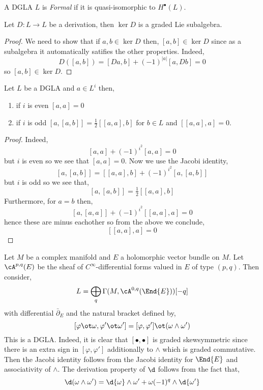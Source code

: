 \documentclass[12pt]{article}
\begin{document}
\begin{defn}
A DGLA $L$ is \textit{Formal} if it is quasi-isomorphic to $H^\bullet(L)$.
\end{defn}

\begin{prop}
Let $D : L \to L$ be a derivation, then $\ker{D}$ is a graded Lie subalgebra.
\end{prop}

\begin{proof}
We need to show that if $a, b \in \ker{D}$ then, $[a,b] \in \ker{D}$ since as a subalgebra it automatically satifies the other properties. Indeed, 
\[ D([a,b]) = [Da, b] + (-1)^{|a|} [a, Db] = 0 \]
so $[a,b] \in \ker{D}$.
\end{proof}

\begin{prop}
Let $L$ be a DGLA and $a \in L^i$ then,
\begin{enumerate}
\item if $i$ is even $[a,a] = 0$
\item if $i$ is odd $[a, [a,b]] = \tfrac{1}{2} [[a,a],b]$ for $b \in L$ and $[[a,a],a] = 0$.
\end{enumerate}
\end{prop}
\begin{proof}
Indeed,
\[ [a,a] + (-1)^{i^2} [a,a] = 0 \]
but $i$ is even so we see that $[a,a] = 0$. Now we use the Jacobi identity,
\[ [a,[a,b]] = [[a,a], b] + (-1)^{i^2} [a,[a,b]] \]
but $i$ is odd so we see that,
\[ [a,[a,b]] = \tfrac{1}{2} [[a,a],b] \]
Furthermore, for $a = b$ then,
\[ [a,[a,a]] + (-1)^{i^2} [[a,a],a] = 0 \]
hence these are minus eachother so from the above we conclude,
\[ [[a,a],a] = 0 \]
\end{proof}

\begin{example}
Let $M$ be a complex manifold and $E$ a holomorphic vector bundle on $M$. Let $\cA^{p,q}(E)$ be the sheaf of $C^{\infty}$-differential forms valued in $E$ of type $(p,q)$. Then consider,
\[ L = \bigoplus_q \Gamma(M, \cA^{0,q}(\End{E})) [-q] \]
with differential $\bar{\partial}_E$ and the natural bracket defined by,
\[ [\varphi \ot \omega, \varphi' \ot \omega'] = [\varphi, \varphi'] \ot (\omega \wedge \omega') \]
This is a DGLA. Indeed, it is clear that $[\bullet, \bullet]$ is graded skewsymmetric since there is an extra sign in $[\varphi, \varphi']$ additionally to $\wedge$ which is graded commutative. Then the Jacobi identity follows from the Jacobi identity for $\End{E}$ and associativity of $\wedge$. The derivation property of $\d$ follows from the fact that,
\[ \d (\omega \wedge \omega') = \d{\omega} \wedge \omega' + \omega (-1)^{q} \wedge \d{\omega'} \]
\end{example}
\end{document}
